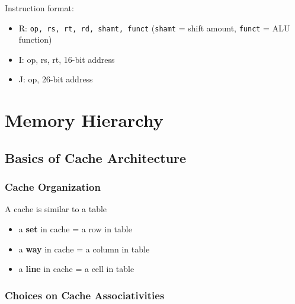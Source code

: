 \documentclass[12pt]{extarticle}
\begin{document}
	\noindent Instruction format:

	\begin{itemize}
		\item R: \texttt{op, rs, rt, rd, shamt, funct} (\texttt{shamt} = shift amount, \texttt{funct} = ALU function)
		\item I: op, rs, rt, 16-bit address
		\item J: op, 26-bit address
	\end{itemize}

	\section{Memory Hierarchy}

	\subsection{Basics of Cache Architecture}

	\subsubsection{Cache Organization}

	A cache is similar to a table

	\begin{itemize}
		\item a \textbf{set} in cache = a row in table
		\item a \textbf{way} in cache = a column in table
		\item a \textbf{line} in cache = a cell in table
	\end{itemize}

	\subsubsection{Choices on Cache Associativities}
\end{document}
